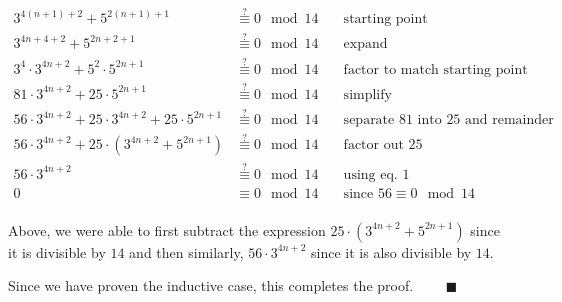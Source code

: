 $$
\begin{aligned}
3^{4(n+1) + 2} + 5^{2(n+1) + 1}             & \stackrel{?}{\equiv} 0 \mod 14
                                            & \quad \text{starting point} \\
3^{4n +4 + 2} + 5^{2n + 2 + 1}              & \stackrel{?}{\equiv} 0 \mod 14
                                            & \quad \text{expand} \\
3^4 \cdot 3^{4n + 2} + 5^2 \cdot 5^{2n + 1} & \stackrel{?}{\equiv} 0 \mod 14
                                            & \quad \text{factor to match starting point} \\
81 \cdot 3^{4n + 2} + 25 \cdot 5^{2n + 1}   & \stackrel{?}{\equiv} 0 \mod 14
                                            & \quad \text{simplify} \\
56 \cdot 3^{4n + 2} + 25 \cdot 3^{4n + 2} + 25 \cdot 5^{2n + 1}
                                            & \stackrel{?}{\equiv} 0 \mod 14
                                            & \quad \text{separate $81$ into $25$ and remainder} \\
56 \cdot 3^{4n + 2} + 25 \cdot (3^{4n + 2} + 5^{2n + 1})
                                            & \stackrel{?}{\equiv} 0 \mod 14
                                            & \quad \text{factor out $25$} \\
56 \cdot 3^{4n + 2}                         & \stackrel{?}{\equiv} 0 \mod 14
                                            & \quad \text{using eq. 1} \\
0                                           & \equiv 0 \mod 14
                                            & \quad \text{since $56 \equiv 0 \mod 14$} \\
\end{aligned}
$$

Above, we were able to first subtract the expression $25 \cdot (3^{4n + 2} +
5^{2n + 1})$ since it is divisible by $14$ and then similarly, $56 \cdot 3^{4n
+ 2}$ since it is also divisible by $14$.

Since we have proven the inductive case, this completes the proof.
$\qquad \blacksquare$

